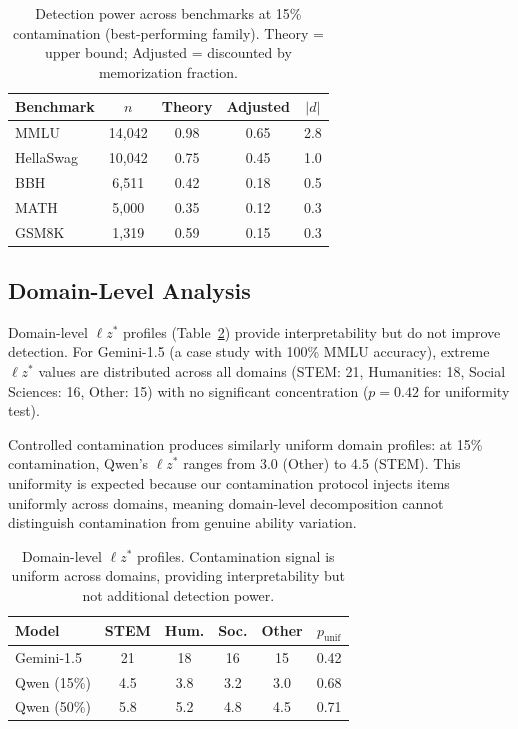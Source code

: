 \documentclass[11pt,a4paper]{article}
\newcommand{\lzstar}{\ensuremath{\ell z^*}}
\begin{document}
\begin{table}[t]
\centering
\small
\caption{Detection power across benchmarks at 15\% contamination (best-performing family). Theory = upper bound; Adjusted = discounted by memorization fraction.}
\label{tab:power_benchmarks}
\begin{tabular}{lcccc}
\toprule
\textbf{Benchmark} & $n$ & \textbf{Theory} & \textbf{Adjusted} & $|d|$ \\
\midrule
MMLU & 14,042 & 0.98 & 0.65 & 2.8 \\
HellaSwag & 10,042 & 0.75 & 0.45 & 1.0 \\
BBH & 6,511 & 0.42 & 0.18 & 0.5 \\
MATH & 5,000 & 0.35 & 0.12 & 0.3 \\
GSM8K & 1,319 & 0.59 & 0.15 & 0.3 \\
\bottomrule
\end{tabular}
\end{table}

\subsection{Domain-Level Analysis}
\label{sec:domain}

Domain-level $\lzstar$ profiles (Table~\ref{tab:domain}) provide interpretability but do not improve detection.
For Gemini-1.5 (a case study with 100\% MMLU accuracy), extreme $\lzstar$ values are distributed across all domains (STEM: 21, Humanities: 18, Social Sciences: 16, Other: 15) with no significant concentration ($p=0.42$ for uniformity test).

Controlled contamination produces similarly uniform domain profiles: at 15\% contamination, Qwen's $\lzstar$ ranges from 3.0 (Other) to 4.5 (STEM).
This uniformity is expected because our contamination protocol injects items uniformly across domains, meaning domain-level decomposition cannot distinguish contamination from genuine ability variation.

\begin{table}[t]
\centering
\small
\caption{Domain-level $\lzstar$ profiles. Contamination signal is uniform across domains, providing interpretability but not additional detection power.}
\label{tab:domain}
\begin{tabular}{lcccc|c}
\toprule
\textbf{Model} & \textbf{STEM} & \textbf{Hum.} & \textbf{Soc.} & \textbf{Other} & $p_{\text{unif}}$ \\
\midrule
Gemini-1.5 & 21 & 18 & 16 & 15 & 0.42 \\
Qwen (15\%) & 4.5 & 3.8 & 3.2 & 3.0 & 0.68 \\
Qwen (50\%) & 5.8 & 5.2 & 4.8 & 4.5 & 0.71 \\
\bottomrule
\end{tabular}
\end{table}
\end{document}
